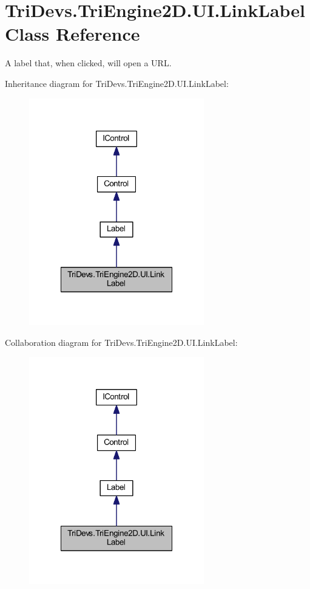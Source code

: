 \hypertarget{class_tri_devs_1_1_tri_engine2_d_1_1_u_i_1_1_link_label}{\section{Tri\-Devs.\-Tri\-Engine2\-D.\-U\-I.\-Link\-Label Class Reference}
\label{class_tri_devs_1_1_tri_engine2_d_1_1_u_i_1_1_link_label}
}


A label that, when clicked, will open a U\-R\-L.  




Inheritance diagram for Tri\-Devs.\-Tri\-Engine2\-D.\-U\-I.\-Link\-Label\-:\nopagebreak
\begin{figure}[H]
\begin{center}
\leavevmode
\includegraphics[width=216pt]{class_tri_devs_1_1_tri_engine2_d_1_1_u_i_1_1_link_label__inherit__graph}
\end{center}
\end{figure}


Collaboration diagram for Tri\-Devs.\-Tri\-Engine2\-D.\-U\-I.\-Link\-Label\-:\nopagebreak
\begin{figure}[H]
\begin{center}
\leavevmode
\includegraphics[width=216pt]{class_tri_devs_1_1_tri_engine2_d_1_1_u_i_1_1_link_label__coll__graph}
\end{center}
\end{figure}

